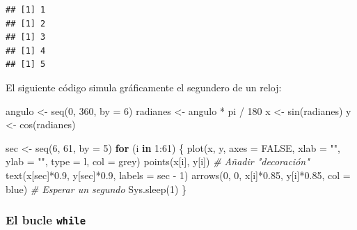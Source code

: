 \documentclass[
]{book}
\newenvironment{Shaded}{\begin{snugshade}}{\end{snugshade}}
\newcommand{\AttributeTok}[1]{\textcolor[rgb]{0.77,0.63,0.00}{#1}}
\newcommand{\CommentTok}[1]{\textcolor[rgb]{0.56,0.35,0.01}{\textit{#1}}}
\newcommand{\ConstantTok}[1]{\textcolor[rgb]{0.00,0.00,0.00}{#1}}
\newcommand{\ControlFlowTok}[1]{\textcolor[rgb]{0.13,0.29,0.53}{\textbf{#1}}}
\newcommand{\DecValTok}[1]{\textcolor[rgb]{0.00,0.00,0.81}{#1}}
\newcommand{\FloatTok}[1]{\textcolor[rgb]{0.00,0.00,0.81}{#1}}
\newcommand{\FunctionTok}[1]{\textcolor[rgb]{0.00,0.00,0.00}{#1}}
\newcommand{\NormalTok}[1]{#1}
\newcommand{\OtherTok}[1]{\textcolor[rgb]{0.56,0.35,0.01}{#1}}
\newcommand{\SpecialCharTok}[1]{\textcolor[rgb]{0.00,0.00,0.00}{#1}}
\newcommand{\StringTok}[1]{\textcolor[rgb]{0.31,0.60,0.02}{#1}}
\theoremstyle{break}
\begin{document}
\begin{verbatim}
## [1] 1
## [1] 2
## [1] 3
## [1] 4
## [1] 5
\end{verbatim}

El siguiente código simula gráficamente el segundero de un
reloj:

\begin{Shaded}
\begin{Highlighting}[]
\NormalTok{angulo }\OtherTok{\textless{}{-}} \FunctionTok{seq}\NormalTok{(}\DecValTok{0}\NormalTok{, }\DecValTok{360}\NormalTok{, }\AttributeTok{by =} \DecValTok{6}\NormalTok{)}
\NormalTok{radianes }\OtherTok{\textless{}{-}}\NormalTok{ angulo }\SpecialCharTok{*}\NormalTok{ pi }\SpecialCharTok{/} \DecValTok{180}
\NormalTok{x }\OtherTok{\textless{}{-}} \FunctionTok{sin}\NormalTok{(radianes)}
\NormalTok{y }\OtherTok{\textless{}{-}} \FunctionTok{cos}\NormalTok{(radianes)}

\NormalTok{sec }\OtherTok{\textless{}{-}} \FunctionTok{seq}\NormalTok{(}\DecValTok{6}\NormalTok{, }\DecValTok{61}\NormalTok{, }\AttributeTok{by =} \DecValTok{5}\NormalTok{)}
\ControlFlowTok{for}\NormalTok{ (i }\ControlFlowTok{in} \DecValTok{1}\SpecialCharTok{:}\DecValTok{61}\NormalTok{) \{}
  \FunctionTok{plot}\NormalTok{(x, y, }\AttributeTok{axes =} \ConstantTok{FALSE}\NormalTok{, }\AttributeTok{xlab =} \StringTok{""}\NormalTok{, }\AttributeTok{ylab =} \StringTok{""}\NormalTok{, }\AttributeTok{type =} \StringTok{\textquotesingle{}l\textquotesingle{}}\NormalTok{, }\AttributeTok{col =} \StringTok{\textquotesingle{}grey\textquotesingle{}}\NormalTok{)}
  \FunctionTok{points}\NormalTok{(x[i], y[i])}
  \CommentTok{\# Añadir "decoración"}
  \FunctionTok{text}\NormalTok{(x[sec]}\SpecialCharTok{*}\FloatTok{0.9}\NormalTok{, y[sec]}\SpecialCharTok{*}\FloatTok{0.9}\NormalTok{, }\AttributeTok{labels =}\NormalTok{ sec }\SpecialCharTok{{-}} \DecValTok{1}\NormalTok{)}
  \FunctionTok{arrows}\NormalTok{(}\DecValTok{0}\NormalTok{, }\DecValTok{0}\NormalTok{, x[i]}\SpecialCharTok{*}\FloatTok{0.85}\NormalTok{, y[i]}\SpecialCharTok{*}\FloatTok{0.85}\NormalTok{, }\AttributeTok{col =} \StringTok{\textquotesingle{}blue\textquotesingle{}}\NormalTok{)}
  \CommentTok{\# Esperar un segundo}
  \FunctionTok{Sys.sleep}\NormalTok{(}\DecValTok{1}\NormalTok{)}
\NormalTok{\}}
\end{Highlighting}
\end{Shaded}

\hypertarget{el-bucle-while}{%
\subsubsection{\texorpdfstring{El bucle \texttt{while}}{El bucle while}}\label{el-bucle-while}}
\end{document}
